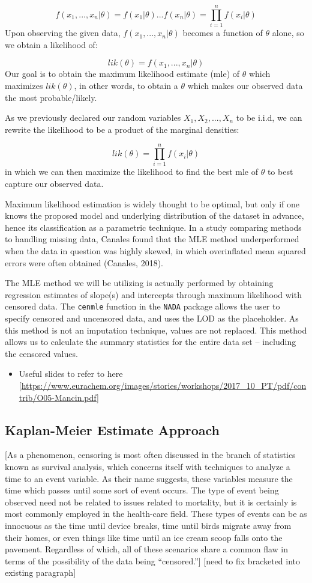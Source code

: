 \documentclass[12pt, twoside]{amherstthesis}
\providecommand{\tightlist}{%
  \setlength{\itemsep}{0pt}\setlength{\parskip}{0pt}}
\begin{document}
\[f(x_1,...,x_n|\theta) = f(x_1|\theta)...f(x_n|\theta) = \prod_{i=1}^{n}f(x_i|\theta)\]
Upon observing the given data, \(f(x_1,...,x_n|\theta)\) becomes a function of \(\theta\) alone, so we obtain a likelihood of:

\[lik(\theta) = f(x_1,...,x_n|\theta)\]
Our goal is to obtain the maximum likelihood estimate (mle) of \(\theta\) which maximizes \(lik(\theta)\), in other words, to obtain a \(\theta\) which makes our observed data the most probable/likely.

As we previously declared our random variables \(X_1, X_2,...,X_n\) to be i.i.d, we can rewrite the likelihood to be a product of the marginal densities:

\[lik(\theta) = \prod_{i=1}^{n} f(x_i|\theta)\]
in which we can then maximize the likelihood to find the best mle of \(\theta\) to best capture our observed data.

Maximum likelihood estimation is widely thought to be optimal, but only if one knows the proposed model and underlying distribution of the dataset in advance, hence its classification as a parametric technique. In a study comparing methods to handling missing data, Canales found that the MLE method underperformed when the data in question was highly skewed, in which overinflated mean squared errors were often obtained (Canales, 2018).

The MLE method we will be utilizing is actually performed by obtaining regression estimates of slope(s) and intercepts through maximum likelihood with censored data. The \texttt{cenmle} function in the \texttt{NADA} package allows the user to specify censored and uncensored data, and uses the LOD as the placeholder. As this method is not an imputation technique, values are not replaced. This method allows us to calculate the summary statistics for the entire data set -- including the censored values.
\begin{itemize}
\tightlist
\item
  Useful slides to refer to here {[}\url{https://www.eurachem.org/images/stories/workshops/2017_10_PT/pdf/contrib/O05-Mancin.pdf}{]}
\end{itemize}
\hypertarget{Kaplan-Meier}{%
\subsection{Kaplan-Meier Estimate Approach}\label{Kaplan-Meier}}

{[}As a phenomenon, censoring is most often discussed in the branch of statistics known as survival analysis, which concerns itself with techniques to analyze a time to an event variable. As their name suggests, these variables measure the time which passes until some sort of event occurs. The type of event being observed need not be related to issues related to mortality, but it is certainly is most commonly employed in the health-care field. These types of events can be as innocuous as the time until device breaks, time until birds migrate away from their homes, or even things like time until an ice cream scoop falls onto the pavement. Regardless of which, all of these scenarios share a common flaw in terms of the possibility of the data being ``censored.''{]} {[}need to fix bracketed into existing paragraph{]}
\end{document}
